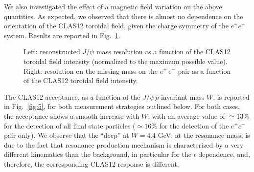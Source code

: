 We also investigated the effect of a magnetic field variation on the above quantities. As expected, we observed that there is almost no dependence on the orientation of the CLAS12 toroidal field, given the charge symmetry of the $e^+ e^-$ system. Results are reported in Fig.~\ref{fig:4}.

\begin{figure}[tpb]
\caption{\footnotesize \label{fig:4} Left: reconstructed $J/\psi$ mass resolution as a function of the CLAS12 toroidal field intensity (normalized to the maximum possible value). Right: resolution on the missing mass on the $e^+\,e^-$ pair as a function of the CLAS12 toroidal field intensity.}
\end{figure}

The CLAS12 acceptance, as a function of the $J/\psi\, p$ invariant mass $W$, is reported in Fig.~\ref{fig:5}, for both measurement strategies outlined below. For both cases, the acceptance shows a smooth increase with $W$, with an average value of $\simeq 13\%$ for the detection of all final state particles ($\simeq 16\%$ for the detection of the $e^{+} e^{-}$ pair only). We observe that the ``deep'' at $W=4.4$ GeV, at the resonance mass, is due to the fact that resonance production mechanism is characterized by a very different kinematics than the background, in particular for the $t$ dependence, and, therefore, the corresponding CLAS12 response is different. 

